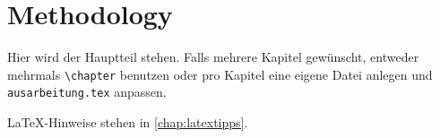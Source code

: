 
\chapter{Methodology}
\label{chap:k2}

Hier wird der Hauptteil stehen. Falls mehrere Kapitel gewünscht, entweder mehrmals \texttt{\textbackslash{}chapter} benutzen oder pro Kapitel eine eigene Datei anlegen und \texttt{ausarbeitung.tex} anpassen.

LaTeX-Hinweise stehen in \cref{chap:latextipps}.

\blinddocument
